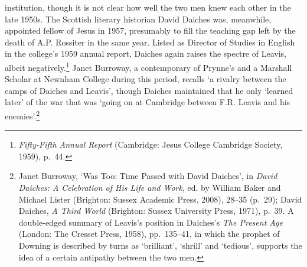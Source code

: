 \documentclass[]{article}
\begin{document}
institution, though it is not clear how well the two men knew each other
in the late 1950s. The Scottish literary historian David Daiches was,
meanwhile, appointed fellow of Jesus in 1957, presumably to fill the
teaching gap left by the death of A.P. Rossiter in the same year. Listed
as Director of Studies in English in the college's 1959 annual report,
Daiches again raises the spectre of Leavis, albeit negatively.\footnote{\emph{Fifty-Fifth
  Annual Report} (Cambridge: Jesus College Cambridge Society, 1959),
  p.~44.} Janet Burroway, a contemporary of Prynne's and a Marshall
Scholar at Newnham College during this period, recalls `a rivalry
between the camps of Daiches and Leavis', though Daiches maintained that
he only `learned later' of the war that was `going on at Cambridge
between F.R. Leavis and his enemies'.\footnote{Janet Burroway, `Was Too:
  Time Passed with David Daiches', in \emph{David Daiches: A Celebration
  of His Life and Work}, ed. by William Baker and Michael Lister
  (Brighton: Sussex Academic Press, 2008), 28--35 (p.~29); David
  Daiches, \emph{A Third World} (Brighton: Sussex University Press,
  1971), p.~39. A double-edged summary of Leavis's position in Daiches's
  \emph{The Present Age} (London: The Cresset Press, 1958), pp.~135--41,
  in which the prophet of Downing is described by turns as `brilliant',
  `shrill' and `tedious', supports the idea of a certain antipathy
  between the two men.}
\end{document}
